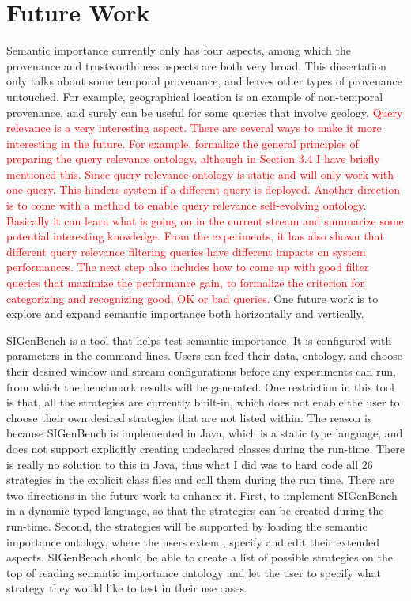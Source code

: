 \section{Future Work}
Semantic importance currently only has four aspects, among which the provenance and trustworthiness aspects are both very broad. 
This dissertation only talks about some temporal provenance, and leaves other types of provenance untouched. 
For example, geographical location is an example of non-temporal provenance, and surely can be useful for some queries that involve geology.
\textcolor{red}{
Query relevance is a very interesting aspect. 
There are several ways to make it more interesting in the future.
For example, formalize the general principles of preparing the query relevance ontology, although in Section 3.4 I have briefly mentioned this. 
Since query relevance ontology is static and will only work with one query. 
This hinders system if a different query is deployed. 
Another direction is to come with a method to enable query relevance self-evolving ontology.
Basically it can learn what is going on in the current stream and summarize some potential interesting knowledge. 
From the experiments, it has also shown that different query relevance filtering queries have different impacts on system performances. 
The next step also includes how to come up with good filter queries that maximize the performance gain, to formalize the criterion for categorizing and recognizing good, OK or bad queries.}
One future work is to explore and expand semantic importance both horizontally and vertically.

SIGenBench is a tool that helps test semantic importance.
It is configured with parameters in the command lines. 
Users can feed their data, ontology, and choose their desired window and stream configurations before any experiments can run, from which the benchmark results will be generated.
One restriction in this tool is that, all the strategies are currently built-in, which does not enable the user to choose their own desired strategies that are not listed within. 
The reason is because SIGenBench is implemented in Java, which is a static type language, and does not support explicitly creating undeclared classes during the run-time. 
There is really no solution to this in Java, thus what I did was to hard code all 26 strategies in the explicit class files and call them during the run time.
There are two directions in the future work to enhance it.
First, to implement SIGenBench in a dynamic typed language, so that the strategies can be created during the run-time.
Second, the strategies will be supported by loading the semantic importance ontology, where the users extend, specify and edit their extended aspects.
SIGenBench should be able to create a list of possible strategies on the top of reading semantic importance ontology and let the user to specify what strategy they would like to test in their use cases. 

